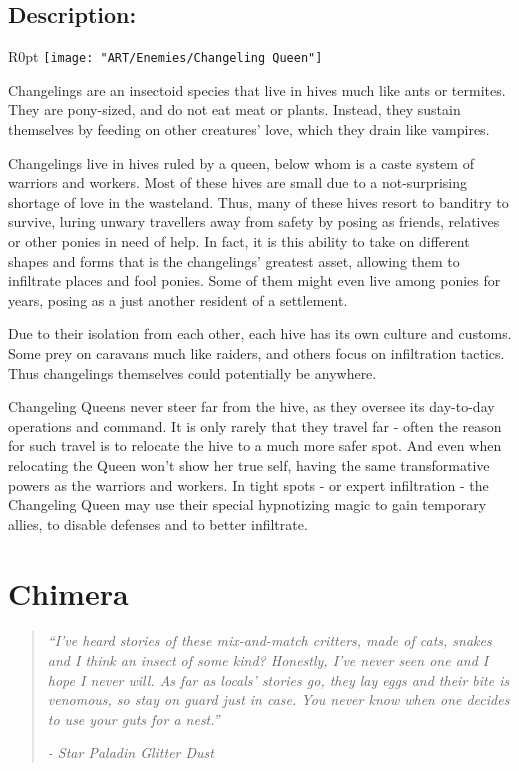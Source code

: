 \documentclass[11pt,a4paper,twocolumn]{book}
\begin{document}
	\subsection*{Description:}
	
	\begin{wrapfigure}{R}{0pt}
		\texttt{[image: "ART/Enemies/Changeling Queen"]}
	\end{wrapfigure}
	
	Changelings are an insectoid species that live in hives much like ants or termites. They are pony-sized, and do not eat meat or plants. Instead, they sustain themselves by feeding on other creatures' love, which they drain like vampires.
	
	Changelings live in hives ruled by a queen, below whom is a caste system of warriors and workers. Most of these hives are small due to a not-surprising shortage of love in the wasteland. Thus, many of these hives resort to banditry to survive, luring unwary travellers away from safety by posing as friends, relatives or other ponies in need of help. In fact, it is this ability to take on different shapes and forms that is the changelings' greatest asset, allowing them to infiltrate places and fool ponies. Some of them might even live among ponies for years, posing as a just another resident of a settlement.
	
	Due to their isolation from each other, each hive has its own culture and customs. Some prey on caravans much like raiders, and others focus on infiltration tactics. Thus changelings themselves could potentially be anywhere.
	
	\bigskip
	Changeling Queens never steer far from the hive, as they oversee its day-to-day operations and command. It is only rarely that they travel far - often the reason for such travel is to relocate the hive to a much more safer spot. And even when relocating the Queen won't show her true self, having the same transformative powers as the warriors and workers. In tight spots - or expert infiltration - the Changeling Queen may use their special hypnotizing magic to gain temporary allies, to disable defenses and to better infiltrate.
	
	\clearpage
	
	\section*{Chimera}
	\begin{verse}
		\emph{``I've heard stories of these mix-and-match critters, made of cats, snakes and I think an insect of some kind? Honestly, I've never seen one and I hope I never will. As far as locals' stories go, they lay eggs and their bite is venomous, so stay on guard just in case. You never know when one decides to use your guts for a nest.''}
		
		\emph{-	Star Paladin Glitter Dust}
	\end{verse}
	
\end{document}

